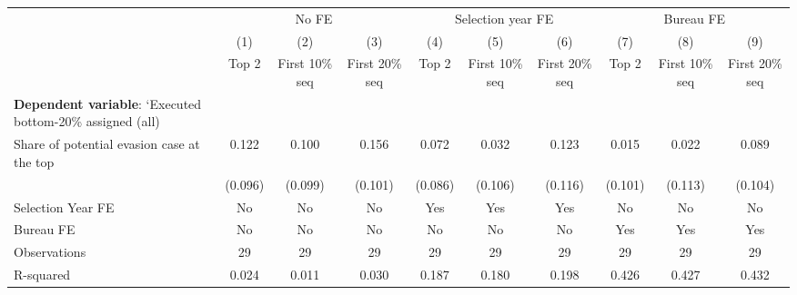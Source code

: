 {
\def\sym#1{\ifmmode^{#1}\else\(^{#1}\)\fi}
\begin{tabular}{l*{9}{c}}
\toprule
            &\multicolumn{3}{c}{No FE}                                        &\multicolumn{3}{c}{Selection year FE}                            &\multicolumn{3}{c}{Bureau FE}                                    \\\cmidrule(lr){2-4}\cmidrule(lr){5-7}\cmidrule(lr){8-10}
            &\multicolumn{1}{c}{(1)}&\multicolumn{1}{c}{(2)}&\multicolumn{1}{c}{(3)}&\multicolumn{1}{c}{(4)}&\multicolumn{1}{c}{(5)}&\multicolumn{1}{c}{(6)}&\multicolumn{1}{c}{(7)}&\multicolumn{1}{c}{(8)}&\multicolumn{1}{c}{(9)}\\
            &\multicolumn{1}{c}{Top 2}&\multicolumn{1}{c}{First 10\% seq}&\multicolumn{1}{c}{First 20\% seq}&\multicolumn{1}{c}{Top 2}&\multicolumn{1}{c}{First 10\% seq}&\multicolumn{1}{c}{First 20\% seq}&\multicolumn{1}{c}{Top 2}&\multicolumn{1}{c}{First 10\% seq}&\multicolumn{1}{c}{First 20\% seq}\\
\midrule
\textbf{Dependent variable}: `Executed bottom-20\% \/ assigned (all)&                     &                     &                     &                     &                     &                     &                     &                     &                     \\
\addlinespace
Share of potential evasion case at the top&       0.122         &       0.100         &       0.156         &       0.072         &       0.032         &       0.123         &       0.015         &       0.022         &       0.089         \\
            &     (0.096)         &     (0.099)         &     (0.101)         &     (0.086)         &     (0.106)         &     (0.116)         &     (0.101)         &     (0.113)         &     (0.104)         \\
\midrule
Selection Year FE&          No         &          No         &          No         &         Yes         &         Yes         &         Yes         &          No         &          No         &          No         \\
Bureau FE   &          No         &          No         &          No         &          No         &          No         &          No         &         Yes         &         Yes         &         Yes         \\
Observations&          29         &          29         &          29         &          29         &          29         &          29         &          29         &          29         &          29         \\
R-squared   &       0.024         &       0.011         &       0.030         &       0.187         &       0.180         &       0.198         &       0.426         &       0.427         &       0.432         \\
\bottomrule
\end{tabular}
}

